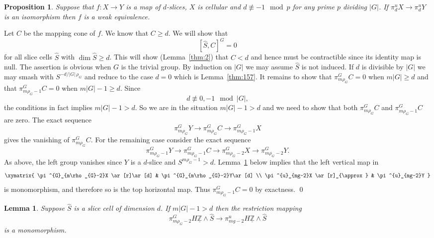 \documentclass{amsart}
\newtheorem{lem}[equation]{Lemma}
\newtheorem{prop}[equation]{Proposition}
\theoremstyle{definition}
\theoremstyle{remark}
\newenvironment{pf}{\bigskip{\em Proof:\/}}{\qed\medskip}
\newcommand{\Z}{{\mathbb Z}}
\newcommand{\piu}{\pi^{u}}
\newcommand{\Zm}{\underline{\Z}}
\newcommand{\slicecell}{\widehat{S}}
\begin{document}
\begin{prop}
\label{thm:66} Suppose that $f:X\to Y$ is a map of $d$-slices, $X$ is
cellular and $d\not\equiv -1\mod p$ for any prime $p$ dividing $|G|$.  If
$\piu_{d}X\to \piu_{d}Y$ is an isomorphism then $f$ is a weak
equivalence.
\end{prop}

\begin{pf}
Let $C$ be the mapping cone of $f$.  We know that $C\ge d$.  We will
show that 
\[
[\slicecell,C ]^{G} = 0
\]
for all slice cells $\slicecell$ with $\dim\slicecell \ge d$.  This
will show (Lemma~\ref{thm:2}) that $C<d$ and hence must be
contractible since its identity map is null.  The assertion is obvious
when $G$ is the trivial group.  By induction on $|G|$ we may assume
$\slicecell$ is not induced.  If $d$ is divisible by $|G|$ we may
smash with $S^{-d/|G|\,\rho_{G}}$ and reduce to the case $d=0$ which
is Lemma~\ref{thm:157}.  It remains to show that $\pi^{G}_{m\rho_{G}}
C=0$ when $m|G|\ge d$ and that $\pi^{G}_{m\rho_{G}-1}C=0$ when
$m|G|-1\ge d$.  Since
\[
d\not\equiv 0, -1\mod |G|,
\]
the conditions in fact implies $m|G|-1>d$.  So we are in the situation
$m|G|-1>d$ and we need to show that both $\pi^{G}_{m\rho_{G}} C$ and
$\pi^{G}_{m\rho_{G}-1} C$ are zero.  The exact sequence
\[
\pi^{G}_{m\rho_{G}}Y \to \pi^{G}_{m\rho_{G}}C \to  \pi^{G}_{m\rho_{G}-1}X 
\]
gives the vanishing of $\pi^{G}_{m\rho_{G}}C$.  For the remaining case
consider the exact sequence
\[
\pi^{G}_{m\rho_{G}-1}Y \to \pi^{G}_{m\rho_{G}-1}C \to
\pi^{G}_{m\rho_{G}-2}X\to \pi^{G}_{m\rho_{G}-2}Y.
\]
As above, the left group vanishes since $Y$ is a $d$-slice and
$S^{m\rho_{G}-1}>d$.  Lemma~\ref{thm:156} below implies that the left
vertical map in
\[
\xymatrix{
\pi^{G}_{m\rho_{G}-2}X  \ar[r]\ar[d]  &   \pi^{G}_{m\rho_{G}-2}Y\ar[d] \\
\piu_{mg-2}X  \ar[r]_{\approx}        & \piu_{mg-2}Y
}	
\]
is monomorphism, and therefore so is the top horizontal map.
Thus $\pi^{G}_{m\rho_{G}-1}C=0$ by exactness.
\end{pf}

\begin{lem}
\label{thm:156}
Suppose $\slicecell$ is a slice cell of dimension $d$.  If $m|G|-1>
d$ then the restriction mapping
\[
\pi^{G}_{m\rho_{G}-2}H\Zm\wedge \slicecell\to 
\piu_{mg-2}H\Zm\wedge \slicecell
\]
is a monomorphism.
\end{lem} 
\end{document}
